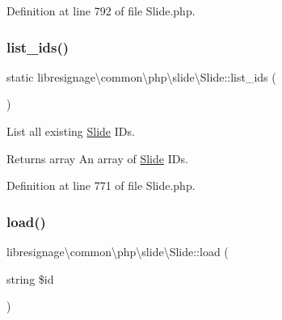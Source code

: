 Definition at line 792 of file Slide.\+php.

\mbox{\label{classlibresignage_1_1common_1_1php_1_1slide_1_1Slide_a234a166c9a496c6484629bae1f078318}} 
\subsubsection{\texorpdfstring{list\+\_\+ids()}{list\_ids()}}
{\footnotesize\ttfamily static libresignage\textbackslash{}common\textbackslash{}php\textbackslash{}slide\textbackslash{}\+Slide\+::list\+\_\+ids (\begin{DoxyParamCaption}{ }\end{DoxyParamCaption})\hspace{0.3cm}{\ttfamily [static]}}

List all existing \hyperlink{classlibresignage_1_1common_1_1php_1_1slide_1_1Slide}{Slide} I\+Ds.

\begin{DoxyReturn}{Returns}
array An array of \hyperlink{classlibresignage_1_1common_1_1php_1_1slide_1_1Slide}{Slide} I\+Ds. 
\end{DoxyReturn}


Definition at line 771 of file Slide.\+php.

\mbox{\label{classlibresignage_1_1common_1_1php_1_1slide_1_1Slide_a7f4a62d13085b3b8e63ca303a77d9a66}} 
\subsubsection{\texorpdfstring{load()}{load()}}
{\footnotesize\ttfamily libresignage\textbackslash{}common\textbackslash{}php\textbackslash{}slide\textbackslash{}\+Slide\+::load (\begin{DoxyParamCaption}\item[{string}]{\$id }\end{DoxyParamCaption})}

